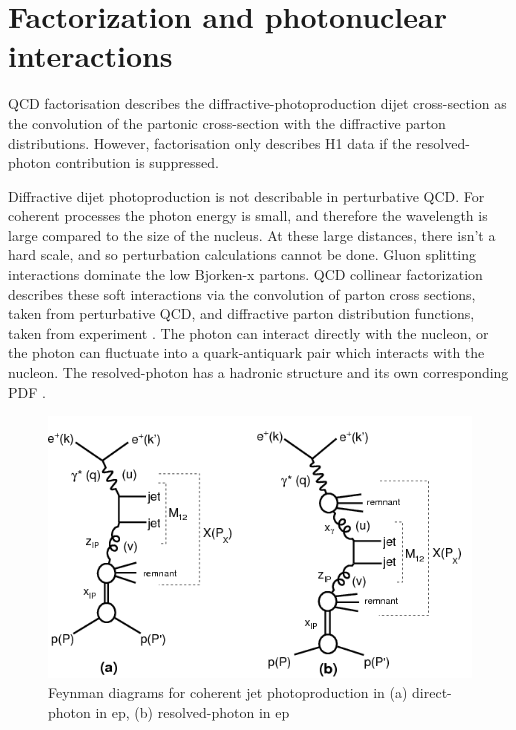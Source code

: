 \section{Factorization and photonuclear interactions}


QCD factorisation describes the diffractive-photoproduction dijet cross-section as the convolution of the partonic cross-section with the diffractive parton distributions. However, factorisation only describes H1 data if the resolved-photon contribution is suppressed. 

Diffractive dijet photoproduction is not describable in perturbative QCD. For coherent processes the photon energy is small, and therefore the wavelength is large compared to the size of the nucleus. At these large distances, there isn't a hard scale, and so perturbation calculations cannot be done. Gluon splitting interactions dominate the low Bjorken-x partons. QCD collinear factorization describes these soft interactions via the convolution of parton cross sections, taken from perturbative QCD, and diffractive parton distribution functions, taken from experiment \cite{Andreev:2015cwa} \cite{Chekanov:2008fh}. The photon can interact directly with the nucleon, or the photon can fluctuate into a quark-antiquark pair which interacts with the nucleon. The resolved-photon has a hadronic structure and its own corresponding PDF \cite{Bauer:1977iq}.
\begin{figure}[h!]
\begin{centering}
\includegraphics[width=6in]{Chapter1/importfigs/h1_2015_feyn.png}
\par\end{centering}
\caption{Feynman diagrams for coherent jet photoproduction in (a) direct-photon in ep, (b) resolved-photon in ep \cite{Andreev:2015cwa} \label{fig:feynmanUPC1}}
\end{figure}

